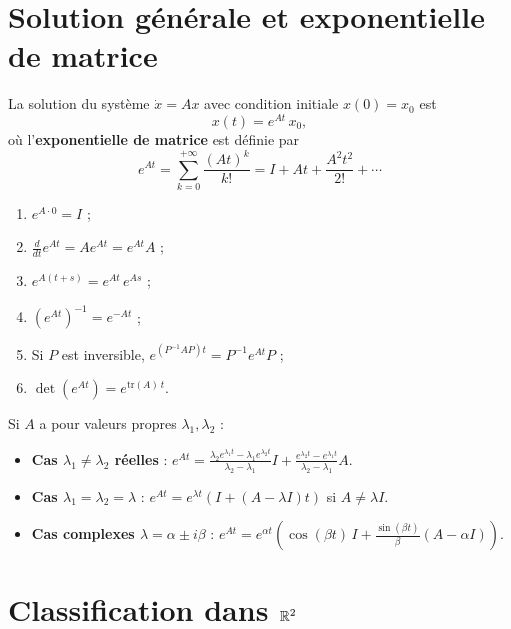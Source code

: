 \section{Solution g\'en\'erale et exponentielle de matrice}

\begin{theoreme}
La solution du syst\`eme $\dot{x} = Ax$ avec condition initiale $x(0) = x_0$
est
\[
    x(t) = e^{At}\, x_0,
\]
o\`u l'\textbf{exponentielle de matrice} est d\'efinie par
\[
    e^{At} = \sum_{k=0}^{+\infty} \frac{(At)^k}{k!} = I + At + \frac{A^2 t^2}{2!} + \cdots
\]
\end{theoreme}

\begin{proposition}[Propri\'et\'es de $e^{At}$]
\begin{enumerate}
    \item $e^{A \cdot 0} = I$ ;
    \item $\frac{d}{dt} e^{At} = A e^{At} = e^{At} A$ ;
    \item $e^{A(t+s)} = e^{At}\, e^{As}$ ;
    \item $(e^{At})^{-1} = e^{-At}$ ;
    \item Si $P$ est inversible, $e^{(P^{-1}AP)t} = P^{-1} e^{At} P$ ;
    \item $\det(e^{At}) = e^{\mathrm{tr}(A)\, t}$.
\end{enumerate}
\end{proposition}

\begin{formules}[title=\textbf{Calcul de $e^{At}$ pour $A \in \R^{2 \times 2}$}]
Si $A$ a pour valeurs propres $\lambda_1, \lambda_2$ :
\begin{itemize}
    \item \textbf{Cas $\lambda_1 \neq \lambda_2$ r\'eelles} :
    $e^{At} = \frac{\lambda_2 e^{\lambda_1 t} - \lambda_1 e^{\lambda_2 t}}{\lambda_2 - \lambda_1} I
    + \frac{e^{\lambda_2 t} - e^{\lambda_1 t}}{\lambda_2 - \lambda_1} A$.
    \item \textbf{Cas $\lambda_1 = \lambda_2 = \lambda$} :
    $e^{At} = e^{\lambda t}(I + (A - \lambda I)t)$ si $A \neq \lambda I$.
    \item \textbf{Cas complexes $\lambda = \alpha \pm i\beta$} :
    $e^{At} = e^{\alpha t}\left(\cos(\beta t)\, I + \frac{\sin(\beta t)}{\beta}(A - \alpha I)\right)$.
\end{itemize}
\end{formules}

\section{Classification dans $\mathbb{R}^2$}


